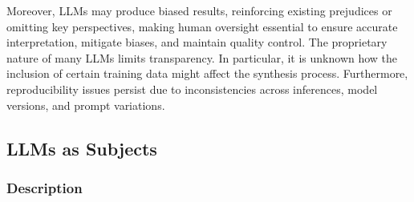 Moreover, LLMs may produce biased results, reinforcing existing prejudices or omitting key perspectives, making human oversight essential to ensure accurate interpretation, mitigate biases, and maintain quality control.
The proprietary nature of many LLMs limits transparency. In particular, it is unknown how the inclusion of certain training data might affect the synthesis process.
Furthermore, reproducibility issues persist due to inconsistencies across inferences, model versions, and prompt variations.


\subsection{LLMs as Subjects}

\subsubsection{Description}

